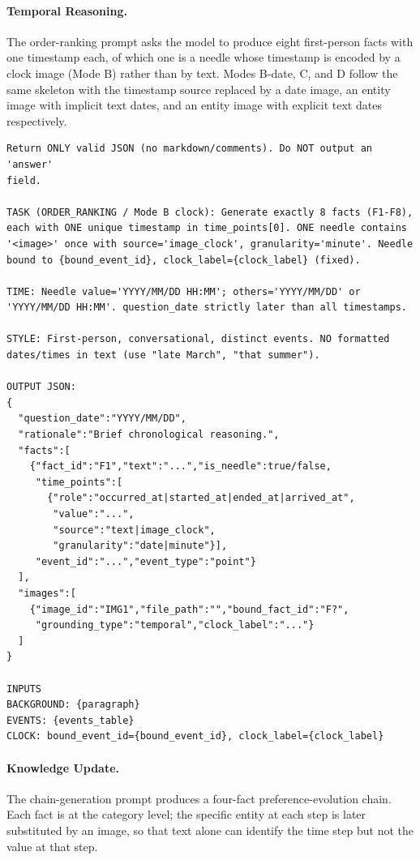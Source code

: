 \documentclass{article}
\begin{document}
\paragraph{Temporal Reasoning.}
The order-ranking prompt asks the model to produce eight first-person facts with one timestamp each, of which one is a needle whose timestamp is encoded by a clock image (Mode B) rather than by text. Modes B-date, C, and D follow the same skeleton with the timestamp source replaced by a date image, an entity image with implicit text dates, and an entity image with explicit text dates respectively.

\begin{promptbox}[colback=black!5, colframe=white!40!black, title={Question Generation: TR (Order Ranking, Mode B)}]{}
\scriptsize
\begin{verbatim}
Return ONLY valid JSON (no markdown/comments). Do NOT output an 'answer'
field.

TASK (ORDER_RANKING / Mode B clock): Generate exactly 8 facts (F1-F8),
each with ONE unique timestamp in time_points[0]. ONE needle contains
'<image>' once with source='image_clock', granularity='minute'. Needle
bound to {bound_event_id}, clock_label={clock_label} (fixed).

TIME: Needle value='YYYY/MM/DD HH:MM'; others='YYYY/MM/DD' or
'YYYY/MM/DD HH:MM'. question_date strictly later than all timestamps.

STYLE: First-person, conversational, distinct events. NO formatted
dates/times in text (use "late March", "that summer").

OUTPUT JSON:
{
  "question_date":"YYYY/MM/DD",
  "rationale":"Brief chronological reasoning.",
  "facts":[
    {"fact_id":"F1","text":"...","is_needle":true/false,
     "time_points":[
       {"role":"occurred_at|started_at|ended_at|arrived_at",
        "value":"...",
        "source":"text|image_clock",
        "granularity":"date|minute"}],
     "event_id":"...","event_type":"point"}
  ],
  "images":[
    {"image_id":"IMG1","file_path":"","bound_fact_id":"F?",
     "grounding_type":"temporal","clock_label":"..."}
  ]
}

INPUTS
BACKGROUND: {paragraph}
EVENTS: {events_table}
CLOCK: bound_event_id={bound_event_id}, clock_label={clock_label}
\end{verbatim}
\end{promptbox}

\paragraph{Knowledge Update.}
The chain-generation prompt produces a four-fact preference-evolution chain. Each fact is at the category level; the specific entity at each step is later substituted by an image, so that text alone can identify the time step but not the value at that step.
\end{document}
